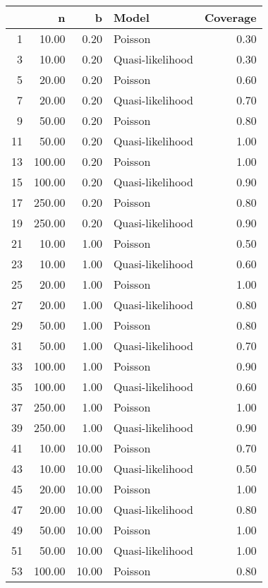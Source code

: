 \begin{table}[ht]
\centering
\begin{tabular}{rrrlr}
  \hline
 & n & b & Model & Coverage \\ 
  \hline
1 & 10.00 & 0.20 & Poisson & 0.30 \\ 
  3 & 10.00 & 0.20 & Quasi-likelihood & 0.30 \\ 
  5 & 20.00 & 0.20 & Poisson & 0.60 \\ 
  7 & 20.00 & 0.20 & Quasi-likelihood & 0.70 \\ 
  9 & 50.00 & 0.20 & Poisson & 0.80 \\ 
  11 & 50.00 & 0.20 & Quasi-likelihood & 1.00 \\ 
  13 & 100.00 & 0.20 & Poisson & 1.00 \\ 
  15 & 100.00 & 0.20 & Quasi-likelihood & 0.90 \\ 
  17 & 250.00 & 0.20 & Poisson & 0.80 \\ 
  19 & 250.00 & 0.20 & Quasi-likelihood & 0.90 \\ 
  21 & 10.00 & 1.00 & Poisson & 0.50 \\ 
  23 & 10.00 & 1.00 & Quasi-likelihood & 0.60 \\ 
  25 & 20.00 & 1.00 & Poisson & 1.00 \\ 
  27 & 20.00 & 1.00 & Quasi-likelihood & 0.80 \\ 
  29 & 50.00 & 1.00 & Poisson & 0.80 \\ 
  31 & 50.00 & 1.00 & Quasi-likelihood & 0.70 \\ 
  33 & 100.00 & 1.00 & Poisson & 0.90 \\ 
  35 & 100.00 & 1.00 & Quasi-likelihood & 0.60 \\ 
  37 & 250.00 & 1.00 & Poisson & 1.00 \\ 
  39 & 250.00 & 1.00 & Quasi-likelihood & 0.90 \\ 
  41 & 10.00 & 10.00 & Poisson & 0.70 \\ 
  43 & 10.00 & 10.00 & Quasi-likelihood & 0.50 \\ 
  45 & 20.00 & 10.00 & Poisson & 1.00 \\ 
  47 & 20.00 & 10.00 & Quasi-likelihood & 0.80 \\ 
  49 & 50.00 & 10.00 & Poisson & 1.00 \\ 
  51 & 50.00 & 10.00 & Quasi-likelihood & 1.00 \\ 
  53 & 100.00 & 10.00 & Poisson & 0.80 \\ 

\end{tabular}
\end{table}
